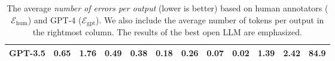 \documentclass[12pt,notitlepage,a4paper,oneside,openany]{report}
\newcommand*{\gptmetric}{$\mathcal{E}_{\text{gpt}}$}
\newcommand*{\humanmetric}{$\mathcal{E}_{\text{hum}}$}
\begin{document}
\begin{table}[t]
\begin{tabular}{lccccccccccr}
        \textbf{GPT-3.5} & 0.65                                   & 1.76                                       & 0.49                                    & 0.38                               & 0.18                                  & 0.26          & 0.07           & 0.02          & 1.39           & 2.42          & 84.9          \\ \bottomrule
    \end{tabular}
    \caption[The average number of errors per output.]{The average \textit{number of errors per output} (lower is better) based on human annotators (\humanmetric{}) and GPT-4 (\gptmetric{}). We also include the average number of tokens per output in the rightmost column. The results of the best open LLM  are emphasized.}
    \label{tab:quintd:results_agg}
\end{table}
\end{document}
